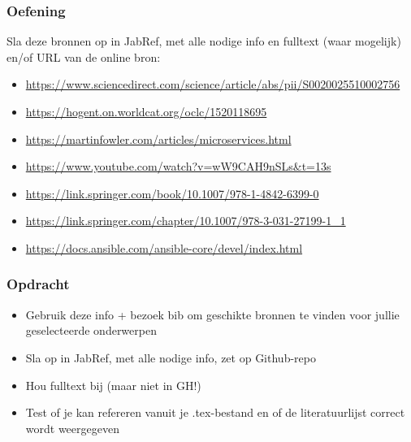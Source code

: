 \documentclass[aspectratio=169]{beamer}
\begin{document}
\begin{frame}[plain]
  \frametitle{Oefening}

  Sla deze bronnen op in JabRef, met alle nodige info en fulltext (waar mogelijk) en/of URL van de online bron:

  \bigskip

  \begin{itemize}
    \item \url{https://www.sciencedirect.com/science/article/abs/pii/S0020025510002756}
    \item \url{https://hogent.on.worldcat.org/oclc/1520118695}
    \item \url{https://martinfowler.com/articles/microservices.html}
    \item \url{https://www.youtube.com/watch?v=wW9CAH9nSLs&t=13s}
    \item \url{https://link.springer.com/book/10.1007/978-1-4842-6399-0}
    \item \url{https://link.springer.com/chapter/10.1007/978-3-031-27199-1_1}
    \item \url{https://docs.ansible.com/ansible-core/devel/index.html}
  \end{itemize}

\end{frame}

\begin{frame}
  \frametitle{Opdracht}

  \begin{itemize}
    \item Gebruik deze info + bezoek bib om geschikte bronnen te vinden voor jullie geselecteerde onderwerpen
    \item Sla op in JabRef, met alle nodige info, zet op Github-repo
    \item Hou fulltext bij (maar niet in GH!)
    \item Test of je kan refereren vanuit je .tex-bestand en of de literatuurlijst correct wordt weergegeven
  \end{itemize}

  \bigskip

\end{frame}
\end{document}
